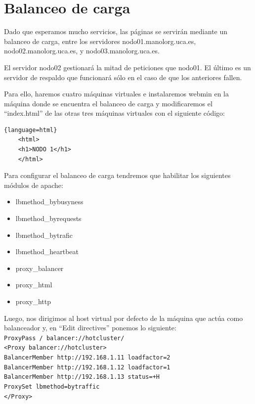 \documentclass[12pt,letterpaper]{article}
\begin{document}
\section{Balanceo de carga}
Dado que esperamos mucho servicios, las páginas se servirán mediante un balanceo de carga, entre los servidores nodo01.manolorg.uca.es, nodo02.manolorg.uca.es, y nodo03.manolorg.uca.es.

El servidor nodo02 gestionará la mitad de peticiones que nodo01. El último es un servidor de respaldo que funcionará sólo en el caso de que los anteriores fallen.

Para ello, haremos cuatro máquinas virtuales e instalaremos webmin en la máquina donde se encuentra el balanceo de carga y modificaremos el ``index.html'' de las otras tres máquinas virtuales con el siguiente código:
\begin{lstlisting}{language=html}
	<html>
	<h1>NODO 1</h1>
	</html>
\end{lstlisting}

Para configurar el balanceo de carga tendremos que habilitar los siguientes módulos de apache:
\begin{itemize}
	\item lbmethod\_bybusyness
	\item lbmethod\_byrequests
	\item lbmethod\_bytrafic
	\item lbmethod\_heartbeat
	\item proxy\_balancer
	\item proxy\_html
	\item proxy\_http
\end{itemize}

Luego, nos dirigimos al host virtual por defecto de la máquina que actúa como balanceador y, en ``Edit directives'' ponemos lo siguiente:\\

\noindent
	\texttt{ProxyPass / balancer://hotcluster/\\
		<Proxy balancer://hotcluster>\\
		BalancerMember http://192.168.1.11 loadfactor=2\\
		BalancerMember http://192.168.1.12 loadfactor=1\\
		BalancerMember http://192.168.1.13 status=+H\\
		ProxySet lbmethod=bytraffic\\
		</Proxy>}\\
\end{document}
